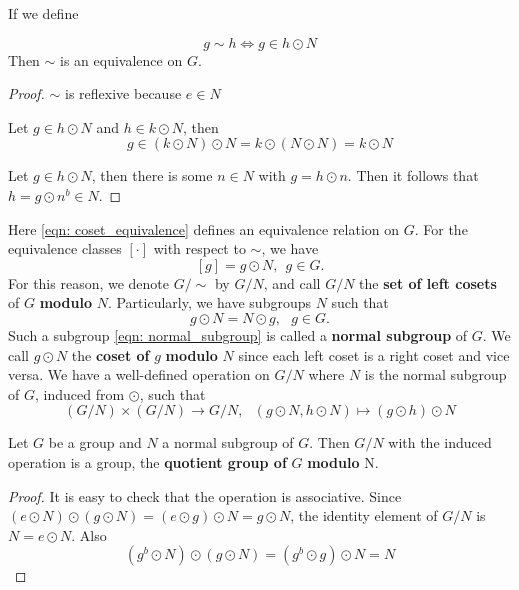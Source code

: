 \begin{note}
	If we define 

	\begin{equation}
		\label{eqn: coset_equivalence}
		g \sim  h  \Leftrightarrow  g \in h \odot N
	\end{equation}
    Then \(\sim\) is an equivalence on \(G\).
	\begin{proof}
		\(\sim\) is reflexive because \(e \in N\)

		Let \(g \in h \odot N\) and \(h \in k \odot N\), then 
		\[
			g \in \left(k \odot N \right) \odot N = k \odot \left(N \odot N\right) = k \odot N
		\]

		Let \(g \in h \odot N\), then there is some \(n \in N\) with \(g = h \odot n\). Then it 
		follows that \(h = g \odot n^b \in N\).
	\end{proof}

	Here \ref{eqn: coset_equivalence} defines an equivalence relation on \(G\). For the equivalence
	classes \(\left [ \cdot  \right ]\) with respect to \(\sim\), we have
	\begin{equation}
		\left[g\right] = g \odot N, \:\: g \in G.
	\end{equation}
	For this reason, we denote \(G / \sim \) by \(G/N\), and call \(G/N\) the \textbf{set of left cosets}
	of \(G\) \textbf{modulo} \(N\).
	Particularly, we have subgroups \(N\) such that
	\begin{equation}
		\label{eqn: normal_subgroup}
		g \odot N = N \odot g, \:\:\: g \in G.
	\end{equation}
	Such a subgroup \ref{eqn: normal_subgroup} is called a \textbf{normal subgroup} of \(G\). We call
	\(g \odot N\) the \textbf{coset of} \(g\) \textbf{modulo} \(N\) since each left coset is a right coset
	and vice versa. 
	We have a well-defined operation on \(G/N\) where \(N\) is the normal subgroup of \(G\), induced from \(\odot\), such that
	\begin{equation}
		(G/N) \times (G/N) \rightarrow G/N, \:\:\: (g\odot N,h\odot N) \mapsto (g\odot h) \odot N
	\end{equation}
\end{note}

\begin{proposition}
	Let \(G\) be a group and \(N\) a normal subgroup of \(G\). Then \(G/N\) with the induced operation
	is a group, the \textbf{quotient group of} \(G\) \textbf{modulo} N.
\end{proposition}

\begin{proof}
	It is easy to check that the operation is associative. Since \(\left(e \odot N\right)
	\odot \left(g\odot N\right) = \left(e \odot g\right) \odot N = g \odot N \), the identity element
	of \(G/N\) is \(N = e \odot N\). Also 
	\[
		\left(g^b \odot N\right) \odot \left(g \odot N\right) = \left(g^b \odot g\right) \odot N = N	
	\]
\end{proof}

